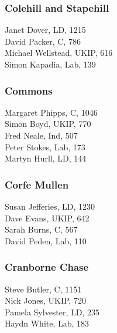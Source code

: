 \documentclass[a4paper,openany,10pt]{book}
\begin{document}
\subsubsection*{Colehill and Stapehill}



Janet Dover, LD, 1215\\
David Packer, C, 786\\
Michael Wellstead, UKIP, 616\\
Simon Kapadia, Lab, 139\\


\subsubsection*{Commons}



Margaret Phipps, C, 1046\\
Simon Boyd, UKIP, 770\\
Fred Neale, Ind, 507\\
Peter Stokes, Lab, 173\\
Martyn Hurll, LD, 144\\


\subsubsection*{Corfe Mullen}



Susan Jefferies, LD, 1230\\
Dave Evans, UKIP, 642\\
Sarah Burns, C, 567\\
David Peden, Lab, 110\\


\subsubsection*{Cranborne Chase}



Steve Butler, C, 1151\\
Nick Jones, UKIP, 720\\
Pamela Sylvester, LD, 235\\
Haydn White, Lab, 183\\
\end{document}
